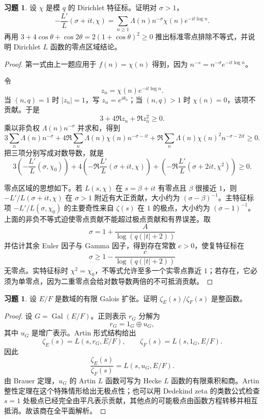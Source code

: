 \documentclass[11pt,a4paper,openany]{ctexbook}
\numberwithin{equation}{chapter}
\newcommand{\Gal}{\operatorname{Gal}}
\theoremstyle{plain}
\theoremstyle{definition}
\newtheorem{exercise}[theorem]{习题}
\theoremstyle{remark}
\begin{document}
\begin{exercise}
设 $\chi$ 是模 $q$ 的 Dirichlet 特征标。证明对 $\sigma>1$，
\[
  -\frac{L'}{L}(\sigma+it,\chi)
  =
  \sum_{n\ge1}\Lambda(n)n^{-\sigma}\chi(n)e^{-it\log n}.
\]
再用 $3+4\cos\theta+\cos2\theta=2(1+\cos\theta)^2\ge0$ 推出标准零点排除不等式，并说明 Dirichlet $L$ 函数的零点区域结论。
\end{exercise}

\begin{proof}
第一式由上一题应用于 $f(n)=\chi(n)$ 得到，因为 $n^{-s}=n^{-\sigma}e^{-it\log n}$。

令
\[
  z_n=\chi(n)e^{-it\log n}.
\]
当 $(n,q)=1$ 时 $|z_n|=1$，写 $z_n=e^{i\theta_n}$；当 $(n,q)>1$ 时 $\chi(n)=0$，该项不贡献。于是
\[
  3+4\Re z_n+\Re z_n^2\ge0.
\]
乘以非负权 $\Lambda(n)n^{-\sigma}$ 并求和，得到
\[
  3\sum_n\Lambda(n)n^{-\sigma}
  +4\Re\sum_n\Lambda(n)\chi(n)n^{-\sigma-it}
  +\Re\sum_n\Lambda(n)\chi(n)^2n^{-\sigma-2it}
  \ge0.
\]
把三项分别写成对数导数，就是
\[
3\left(-\frac{L'}{L}(\sigma,\chi_0)\right)
+4\left(-\Re\frac{L'}{L}(\sigma+it,\chi)\right)
+\left(-\Re\frac{L'}{L}(\sigma+2it,\chi^2)\right)\ge0.
\]

零点区域的思想如下。若 $L(s,\chi)$ 在 $s=\beta+it$ 有零点且 $\beta$ 很接近 $1$，则 $-L'/L(\sigma+it,\chi)$ 在 $\sigma>1$ 附近有大正贡献，大小约为 $(\sigma-\beta)^{-1}$。主特征标项 $-L'/L(\sigma,\chi_0)$ 的主要奇性来自 $\zeta(s)$ 在 $1$ 的极点，大小约为 $(\sigma-1)^{-1}$。上面的非负不等式迫使零点贡献不能超过极点贡献和有界误差。取
\[
  \sigma=1+\frac{A}{\log(q(|t|+2))}
\]
并估计其余 Euler 因子与 Gamma 因子，得到存在常数 $c>0$，使复特征标在
\[
  \sigma\ge 1-\frac{c}{\log(q(|t|+2))}
\]
无零点。实特征标时 $\chi^2=\chi_0$，不等式允许至多一个实零点靠近 $1$；若存在，它必须为单零点，因为二重零点会给对数导数两倍的不可抵消贡献。
\end{proof}

\begin{exercise}
设 $E/F$ 是数域的有限 Galois 扩张。证明 $\zeta_E(s)/\zeta_F(s)$ 是整函数。
\end{exercise}

\begin{proof}
设 $G=\Gal(E/F)$。正则表示 $r_G$ 分解为
\[
  r_G=1_G\oplus u_G,
\]
其中 $u_G$ 是增广表示。Artin 形式结构给出
\[
  \zeta_E(s)=L(s,r_G,E/F),\qquad
  \zeta_F(s)=L(s,1_G,E/F).
\]
因此
\[
  \frac{\zeta_E(s)}{\zeta_F(s)}=L(s,u_G,E/F).
\]
由 Brauer 定理，$u_G$ 的 Artin $L$ 函数可写为 Hecke $L$ 函数的有限乘积和商。Artin 整性定理在这个特殊情形给出无极点性；也可以用 Dedekind zeta 的类数公式检查 $s=1$ 处极点已经完全由平凡表示贡献，其他点的可能极点由函数方程转移并相互抵消。故该商在全平面解析。
\end{proof}
\end{document}
